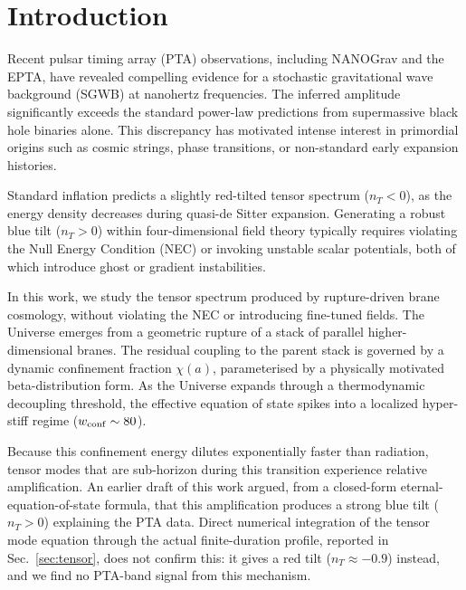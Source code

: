 \documentclass[twocolumn, PRD, amsmath, amssymb, aps, nofootinbib]{revtex4-2}
\begin{document}
\section{Introduction}
Recent pulsar timing array (PTA) observations, including NANOGrav and the EPTA, have revealed compelling evidence for a stochastic gravitational wave background (SGWB) at nanohertz frequencies. The inferred amplitude significantly exceeds the standard power-law predictions from supermassive black hole binaries alone. This discrepancy has motivated intense interest in primordial origins such as cosmic strings, phase transitions, or non-standard early expansion histories.

Standard inflation predicts a slightly red-tilted tensor spectrum ($n_T < 0$), as the energy density decreases during quasi-de Sitter expansion. Generating a robust blue tilt ($n_T > 0$) within four-dimensional field theory typically requires violating the Null Energy Condition (NEC) or invoking unstable scalar potentials, both of which introduce ghost or gradient instabilities.

In this work, we study the tensor spectrum produced by rupture-driven brane cosmology, without violating the NEC or introducing fine-tuned fields. The Universe emerges from a geometric rupture of a stack of parallel higher-dimensional branes. The residual coupling to the parent stack is governed by a dynamic confinement fraction $\chi(a)$, parameterised by a physically motivated beta-distribution form. As the Universe expands through a thermodynamic decoupling threshold, the effective equation of state spikes into a localized hyper-stiff regime ($w_{\rm conf} \sim 80$).

Because this confinement energy dilutes exponentially faster than radiation, tensor modes that are sub-horizon during this transition experience relative amplification. An earlier draft of this work argued, from a closed-form eternal-equation-of-state formula, that this amplification produces a strong blue tilt ($n_T>0$) explaining the PTA data. Direct numerical integration of the tensor mode equation through the actual finite-duration profile, reported in Sec.~\ref{sec:tensor}, does not confirm this: it gives a red tilt ($n_T\approx-0.9$) instead, and we find no PTA-band signal from this mechanism.
\end{document}
